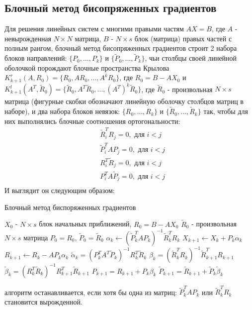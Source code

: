 \subsection[Блочный метод бисопряженных градиентов]{Блочный метод бисопряженных градиентов \cite{OLEARY1980293}}
Для решения линейных систем с многими правыми частям $AX=B$, где $A$ - невырожденная $N \times N$ матрица,
$B$ - $N \times s$ блок (матрица) правых частей с полным рангом,  
блочный метод бисопряженных градиентов строит 2 набора блоков направлений:
$\{ P_0, ... , P_k \}$ и $\{ \tilde{P}_0, ... , \tilde{P}_k \}$, чьи столбцы своей линейной оболочкой
порождают блочные пространства Крылова $K^r_{k+1}(A,R_0) = \{R_0,A R_0, ... ,A^k R_0\}$, где $R_0 = B - A X_0$ и
 $K^l_{k+1}(A^T,\tilde{R}_0) = \{\tilde{R}_0,A^T \tilde{R}_0, ... ,(A^T)^k \tilde{R}_0\}$, где $\tilde{R}_0$ - 
 произвольная $N \times s$ матрица (фигурные скобки обозначают линейную оболочку столбцов матриц в наборе), 
и два набора блоков невязок: $\{R_0, ... , R_k\}$ и $\{\tilde{R}_0, ... , \tilde{R}_k\}$ так, чтобы для них выполнялись 
блочные соотношения ортогональности:
\begin{align}
    &\tilde{R}_i^T R_j = 0, \text{ для } i < j \label{eq:bbcgorth1}\\
    &\tilde{P}_i^T A P_j = 0, \text{ для } i < j \label{eq:bbcgorth2}\\
    &R_i^T \tilde{R}_j = 0, \text{ для } i < j \label{eq:bbcgorth3}\\
    &P_i^T A \tilde{P}_j = 0, \text{ для } i < j \label{eq:bbcgorth4}\\
\end{align}
И выглядит он следующим образом:
\begin{algorithm}[H]
    \caption{Блочный метод биспоряженных градиентов}
    \begin{algorithmic}
        \State $X_0$ - $N \times s$ блок начальных приближений, $R_0 = B - AX_0$
        \State $\tilde{R}_0$ - произвольная $ N\times s $ матрица
        \State $P_0 = R_0$, $\tilde{P}_0 = \tilde{R}_0$
            \State $\alpha_k \gets (\tilde{P}_k^T A P_k)^{-1} \tilde{R}_k^T R_k$
            \State $X_{k+1} \gets X_k + P_k \alpha_k$
            \State $R_{k+1} \gets R_k - A P_k \alpha_k$
            \State $\tilde{\alpha}_k = (P_k^TA^T \tilde{P}_k)^{-1}R_k^T \tilde{R}_k$
            \State $\beta_k = (\tilde{R}_k^T R_k)^{-1} \tilde{R}_{k+1}^T R_{k+1}$
            \State $\tilde{\beta}_k = (R_k^T \tilde{R}_k)^{-1} R_{k+1}^T \tilde{R}_{k+1}$
            \State $P_{k+1} = R_{k+1} + P_k \beta_k$
            \State $\tilde{P}_{k+1} = \tilde{R}_{k+1} + \tilde{P}_k \tilde{\beta}_k$
        \EndFor 
    \end{algorithmic}
\end{algorithm}
алгоритм останавливается, если хотя бы одна из матриц: $\tilde{P}_k^T A P_k$ или $\tilde{R}_k^T R_k$ становится 
вырожденной. 

